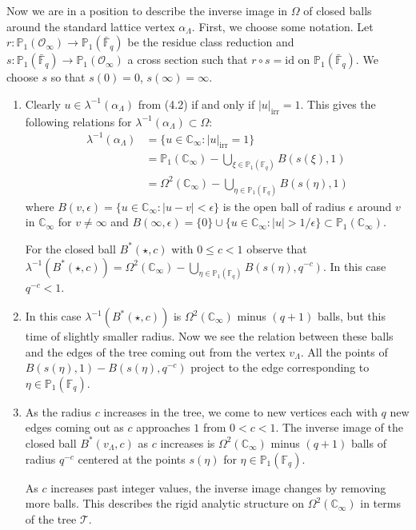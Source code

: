 \documentclass[12pt,a4paper]{article}
\theoremstyle{plain}
\theoremstyle{definition}
\theoremstyle{remark}
\begin{document}
Now we are in a position to describe the inverse image in $\Omega$ of closed 
balls around the standard lattice vertex $\alpha_\Lambda$. First, we choose some 
notation. Let $r\colon \mathbb{P}_1(\mathcal{O}_\infty) \to \mathbb{P}_1(\bar{\mathbb{F}}_q)$ 
be the residue class reduction and $s\colon \mathbb{P}_1(\bar{\mathbb{F}}_q) \to \mathbb{P}_1(\mathcal{O}_\infty)$ 
a cross section such that $r \circ s = \text{id}$ on $\mathbb{P}_1(\bar{\mathbb{F}}_q)$. 
We choose $s$ so that $s(0) = 0$, $s(\infty) = \infty$.

\begin{enumerate}[label=(\arabic*)]
\item Clearly $u \in \lambda^{-1}(\alpha_\Lambda)$ from (4.2) if and only if 
$|u|_{\text{irr}} = 1$. This gives the following relations for 
$\lambda^{-1}(\alpha_\Lambda) \subset \Omega$:
\begin{align*}
\lambda^{-1}(\alpha_\Lambda) &= \{u \in \mathbb{C}_\infty : |u|_{\text{irr}} = 1\} \\
&= \mathbb{P}_1(\mathbb{C}_\infty) - \bigcup_{\xi \in \mathbb{P}_1(\mathbb{F}_q)} B(s(\xi), 1) \\
&= \Omega^2(\mathbb{C}_\infty) - \bigcup_{\eta \in \mathbb{P}_1(\mathbb{F}_q)} B(s(\eta), 1)
\end{align*}
where $B(v,\epsilon) = \{u \in \mathbb{C}_\infty : |u - v| < \epsilon\}$ is the 
open ball of radius $\epsilon$ around $v$ in $\mathbb{C}_\infty$ for 
$v \neq \infty$ and $B(\infty, \epsilon) = \{0\} \cup \{u \in \mathbb{C}_\infty : |u| > 1/\epsilon\} \subset \mathbb{P}_1(\mathbb{C}_\infty)$.

For the closed ball $B^*(\star, c)$ with $0 \leqslant c < 1$ observe that 
$\lambda^{-1}(B^*(\star, c)) = \Omega^2(\mathbb{C}_\infty) - \bigcup_{\eta \in \mathbb{P}_1(\mathbb{F}_q)} B(s(\eta), q^{-c})$. In this case $q^{-c} < 1$.

\item In this case $\lambda^{-1}(B^*(\star, c))$ is $\Omega^2(\mathbb{C}_\infty)$ minus 
$(q+1)$ balls, but this time of slightly smaller radius. Now we see the 
relation between these balls and the edges of the tree coming out from the 
vertex $v_\Lambda$. All the points of $B(s(\eta), 1) - B(s(\eta), q^{-c})$ 
project to the edge corresponding to $\eta \in \mathbb{P}_1(\mathbb{F}_q)$.

\item As the radius $c$ increases in the tree, we come to new vertices each 
with $q$ new edges coming out as $c$ approaches $1$ from $0 < c < 1$. The 
inverse image of the closed ball $B^*(v_\Lambda, c)$ as $c$ increases is 
$\Omega^2(\mathbb{C}_\infty)$ minus $(q+1)$ balls of radius $q^{-c}$ centered 
at the points $s(\eta)$ for $\eta \in \mathbb{P}_1(\mathbb{F}_q)$.

As $c$ increases past integer values, the inverse image changes by removing 
more balls. This describes the rigid analytic structure on 
$\Omega^2(\mathbb{C}_\infty)$ in terms of the tree $\mathcal{T}$.
\end{enumerate}
\end{document}
